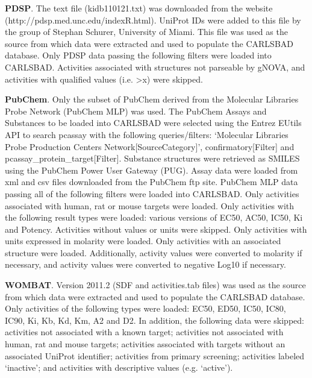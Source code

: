 \textbf{PDSP}. The text file (kidb110121.txt) was downloaded from the website (http://pdsp.med.unc.edu/indexR.html). UniProt IDs were added to this file by the group of Stephan Schurer, University of Miami. This file was used as the source from which data were extracted and used to populate the CARLSBAD database. Only PDSP data passing the following filters were loaded into CARLSBAD. Activities associated with structures not parseable by gNOVA, and activities with qualified values (i.e. \textgreater x) were skipped.

\textbf{PubChem}. Only the subset of PubChem derived from the Molecular Libraries Probe Network (PubChem MLP) was used. The PubChem Assays and Substances to be loaded into CARLSBAD were selected using the Entrez EUtils API to search pcassay with the following queries/filters: ‘Molecular Libraries Probe Production Centers Network[SourceCategory]’, confirmatory[Filter] and pcassay\_protein\_target[Filter]. Substance structures were retrieved as SMILES using the PubChem Power User Gateway (PUG). Assay data were loaded from xml and csv files downloaded from the PubChem ftp site. PubChem MLP data passing all of the following filters were loaded into CARLSBAD. Only activities associated with human, rat or mouse targets were loaded. Only activities with the following result types were loaded: various versions of EC50, AC50, IC50, Ki and Potency. Activities without values or units were skipped. Only activities with units expressed in molarity were loaded. Only activities with an associated structure were loaded. Additionally, activity values were converted to molarity if necessary, and activity values were converted to negative Log10 if necessary.

\textbf{WOMBAT}. Version 2011.2 (SDF and activities.tab files) was used as the source from which data were extracted and used to populate the CARLSBAD database. Only activities of the following types were loaded: EC50, ED50, IC50, IC80, IC90, Ki, Kb, Kd, Km, A2 and D2. In addition, the following data were skipped: activities not associated with a known target; activities not associated with human, rat and mouse targets; activities associated with targets without an associated UniProt identifier; activities from primary screening; activities labeled ‘inactive’; and activities with descriptive values (e.g. ‘active’).

